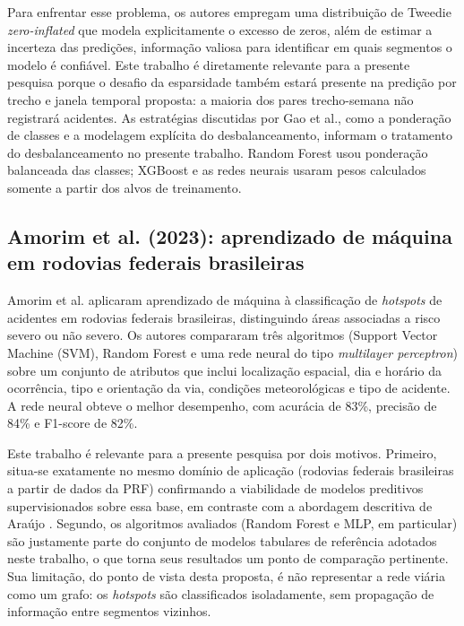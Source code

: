 \documentclass[12pt]{article}
\begin{document}
Para enfrentar esse problema, os autores empregam uma distribuição de
Tweedie \textit{zero-inflated} que modela explicitamente o excesso de
zeros, além de estimar a incerteza das predições, informação valiosa
para identificar em quais segmentos o modelo é confiável. Este trabalho
é diretamente relevante para a presente pesquisa porque o desafio da
esparsidade também estará presente na predição por trecho e janela
temporal proposta: a maioria dos pares trecho-semana não registrará
acidentes. As estratégias discutidas por Gao et al., como a ponderação
de classes e a modelagem explícita do desbalanceamento, informam o
tratamento do desbalanceamento no presente trabalho. Random Forest
usou ponderação balanceada das classes; XGBoost e as redes neurais
usaram pesos calculados somente a partir dos alvos de treinamento.

\subsection{Amorim et al. (2023): aprendizado de máquina em rodovias federais brasileiras}

Amorim et al. \cite{amorim2023} aplicaram aprendizado de máquina à
classificação de \textit{hotspots} de acidentes em rodovias federais
brasileiras, distinguindo áreas associadas a risco severo ou não severo.
Os autores compararam três algoritmos (Support Vector Machine (SVM),
Random Forest e uma rede neural do tipo \textit{multilayer perceptron}) sobre um conjunto de atributos que inclui localização espacial, dia
e horário da ocorrência, tipo e orientação da via, condições
meteorológicas e tipo de acidente. A rede neural obteve o melhor
desempenho, com acurácia de 83\%, precisão de 84\% e F1-score de 82\%.

Este trabalho é relevante para a presente pesquisa por dois motivos.
Primeiro, situa-se exatamente no mesmo domínio de aplicação (rodovias
federais brasileiras a partir de dados da PRF) confirmando a
viabilidade de modelos preditivos supervisionados sobre essa base, em
contraste com a abordagem descritiva de Araújo \cite{araujo2022}.
Segundo, os algoritmos avaliados (Random Forest e MLP, em particular)
são justamente parte do conjunto de modelos tabulares de referência
adotados neste trabalho, o que torna seus resultados um ponto de
comparação pertinente. Sua limitação, do ponto de vista desta proposta,
é não representar a rede viária como um grafo: os \textit{hotspots} são
classificados isoladamente, sem propagação de informação entre segmentos
vizinhos.
\end{document}
